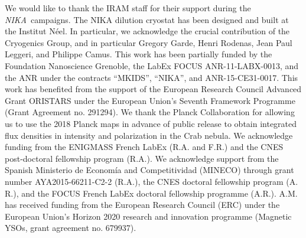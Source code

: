 \documentclass[twocolumn,traditabstract]{aa}
\def\NIKA{\textit{NIKA}}
\begin{document}
\vspace{0.2cm}
 \begin{acknowledgements}
We would like to thank the IRAM staff for their support during the \NIKA\ campaigns. 
The NIKA dilution cryostat has been designed and built at the Institut N\'eel. 
In particular, we acknowledge the crucial contribution of the Cryogenics Group, and 
in particular Gregory Garde, Henri Rodenas, Jean Paul Leggeri, and Philippe Camus. 
This work has been partially funded by the Foundation Nanoscience Grenoble, the LabEx FOCUS ANR-11-LABX-0013, and 
the ANR under the contracts ``MKIDS'', ``NIKA'', and ANR-15-CE31-0017. 
This work has benefited from the support of the European Research Council Advanced Grant ORISTARS 
under the European Union's Seventh Framework Programme (Grant Agreement no. 291294).
We thank the Planck Collaboration for allowing us to use the 2018 Planck maps in advance of public release to obtain integrated flux densities in intensity and polarization in the Crab nebula. We acknowledge funding from the ENIGMASS French LabEx (R.A. and F.R.) and
the CNES post-doctoral fellowship program (R.A.). We acknowledge  support from the Spanish Ministerio de Econom\'ia and Competitividad (MINECO) through grant number AYA2015-66211-C2-2 (R.A.), the CNES doctoral fellowship program (A. R.), and
the FOCUS French LabEx doctoral fellowship programme (A.R.).
A.M. has received funding from the European Research Council (ERC) under the European Union’s Horizon 2020 research and innovation programme (Magnetic YSOs, grant agreement no. 679937).
\end{acknowledgements}
\end{document}
